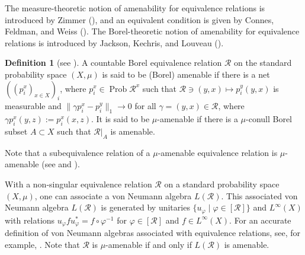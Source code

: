 \documentclass{amsart}
\newcommand{\G}{\mathcal{G}}
\newcommand{\R}{\mathcal{R}}
\renewcommand{\phi}{\varphi}
\newcommand{\Prob}[1]{\operatorname{Prob}{#1}}
\theoremstyle{remark}
\newtheorem*{remark}{Remark}
\theoremstyle{definition}
\newtheorem*{definition}{Definition}
\begin{document}

The measure-theoretic notion of amenability for equivalence relations is introduced by Zimmer (\cite{Zimmer}), and an equivalent condition is given by Connes, Feldman, and Weiss (\cite{ConnesFeldmanWeiss}).
The Borel-theoretic notion of amenability for equivalence relations is introduced by Jackson, Kechris, and Louveau (\cite{JacksonKechrisLouveau}).

\begin{definition}[see \cite{Zimmer, ConnesFeldmanWeiss, JacksonKechrisLouveau}]
A countable Borel equivalence relation $\R$ on the standard probability space $(X, \mu)$ is said to be (Borel) amenable if there is a net $((p_i^x)_{x \in X})_i$, where $p_i^x \in \Prob \R^x$ such that $\R \ni (y, x) \mapsto p_i^y(y, x)$ is measurable and $\| \gamma p_i^x - p_i^y \| _1 \to 0$ for all $\gamma = (y, x) \in \R$, where $\gamma p_i^x (y, z):= p_i^x(x, z)$.
It is said to be $\mu$-amenable if there is a $\mu$-conull Borel subset $A \subset X$ such that $\R |_A$ is amenable.
\end{definition}

Note that a subequivalence relation of a $\mu$-amenable equivalence relation is $\mu$-amenable (see \cite{ConnesFeldmanWeiss} and \cite[Proposition 5.1]{Moore}).

With a non-singular equivalence relation $\R$ on a standard probability space $(X, \mu)$, one can associate a von Neumann algebra $L(\R)$.
This associated von Neumann algebra $L(\R)$ is generated by unitaries $\{ u_\phi \mid \phi \in [ \R ] \}$ and $L^{\infty}(X)$ with relations $u_{\phi} f u_{\phi}^* = f \circ \phi^{-1}$ for $\phi \in [\R]$ and $f \in L^{\infty}(X)$.
For an accurate definition of von Neumann algebras associated with equivalence relations, see, for example, \cite{FeldmanMoore}.
Note that $\R$ is $\mu$-amenable if and only if $L(\R)$ is amenable.
\end{document}
